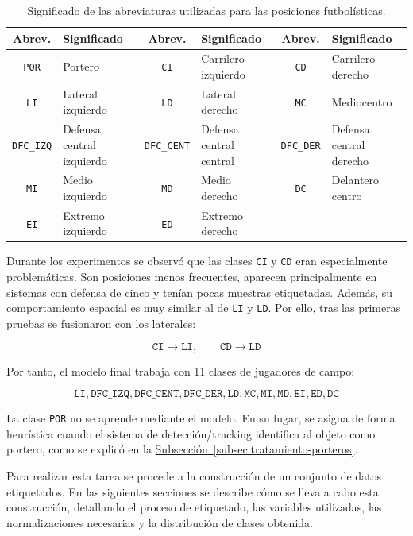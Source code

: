 \begin{table}[H]
\centering
\scriptsize
\begin{tabular}{c|l c|l c|l}
\textbf{Abrev.} & \textbf{Significado} & 
\textbf{Abrev.} & \textbf{Significado} & 
\textbf{Abrev.} & \textbf{Significado} \\
\hline\hline
\texttt{POR} & Portero & \texttt{CI} & Carrilero izquierdo & \texttt{CD} & Carrilero derecho \\
\texttt{LI} & Lateral izquierdo & \texttt{LD} & Lateral derecho & \texttt{MC} & Mediocentro \\
\texttt{DFC\_IZQ} & Defensa central izquierdo & \texttt{DFC\_CENT} & Defensa central central & \texttt{DFC\_DER} & Defensa central derecho \\
\texttt{MI} & Medio izquierdo & \texttt{MD} & Medio derecho & \texttt{DC} & Delantero centro \\
\texttt{EI} & Extremo izquierdo & \texttt{ED} & Extremo derecho & & \\
\end{tabular}
\caption[Abreviaturas de las posiciones futbolísticas]{Significado de las abreviaturas utilizadas para las posiciones futbolísticas.}
\label{tab:abreviaturas_posiciones}
\end{table}

Durante los experimentos se observó que las clases \texttt{CI} y \texttt{CD} eran especialmente problemáticas. Son posiciones menos frecuentes, aparecen principalmente en sistemas con defensa de cinco y tenían pocas muestras etiquetadas. Además, su comportamiento espacial es muy similar al de \texttt{LI} y \texttt{LD}. Por ello, tras las primeras pruebas se fusionaron con los laterales:

\[
\texttt{CI} \rightarrow \texttt{LI}, \qquad \texttt{CD} \rightarrow \texttt{LD}
\]

Por tanto, el modelo final trabaja con 11 clases de jugadores de campo:

\[
\texttt{LI}, \texttt{DFC\_IZQ}, \texttt{DFC\_CENT}, \texttt{DFC\_DER}, \texttt{LD}, \texttt{MC}, \texttt{MI}, \texttt{MD}, \texttt{EI}, \texttt{ED}, \texttt{DC}
\]

La clase \texttt{POR} no se aprende mediante el modelo. En su lugar, se asigna de forma heurística cuando el sistema de detección/tracking identifica al objeto como portero, como se explicó en la \hyperref[subsec:tratamiento-porteros]{Subsección~\ref*{subsec:tratamiento-porteros}}.

Para realizar esta tarea se procede a la construcción de un conjunto de datos etiquetados. En las siguientes secciones se describe cómo se lleva a cabo esta construcción, detallando el proceso de etiquetado, las variables utilizadas, las normalizaciones necesarias y la distribución de clases obtenida.

